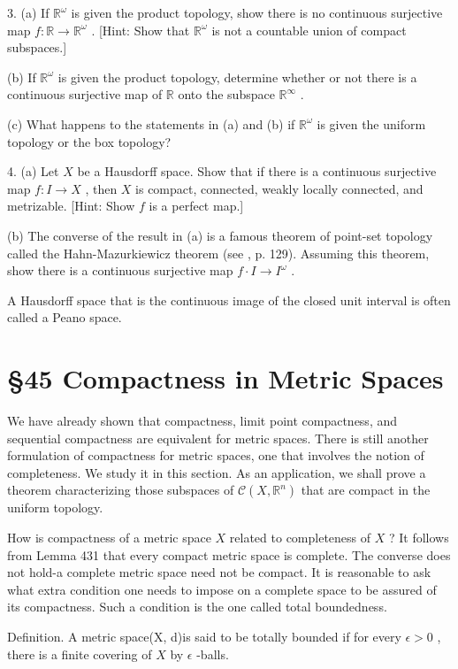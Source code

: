 3. (a) If \({\mathbb{R}}^{\omega }\) is given the product topology, show there is no continuous surjective map \(f : \mathbb{R} \rightarrow  {\mathbb{R}}^{\omega }\) . [Hint: Show that \({\mathbb{R}}^{\omega }\) is not a countable union of compact subspaces.]

(b) If \({\mathbb{R}}^{\omega }\) is given the product topology, determine whether or not there is a continuous surjective map of \(\mathbb{R}\) onto the subspace \({\mathbb{R}}^{\infty }\) .

(c) What happens to the statements in (a) and (b) if \({\mathbb{R}}^{\omega }\) is given the uniform topology or the box topology?

4. (a) Let \(X\) be a Hausdorff space. Show that if there is a continuous surjective map \(f : I \rightarrow  X\) , then \(X\) is compact, connected, weakly locally connected, and metrizable. [Hint: Show \(f\) is a perfect map.]

(b) The converse of the result in (a) is a famous theorem of point-set topology called the Hahn-Mazurkiewicz theorem (see 		\cite{HockingYoung1961}, p. 129). Assuming this theorem, show there is a continuous surjective map \(f \cdot  I \rightarrow  {I}^{\omega }\) .

A Hausdorff space that is the continuous image of the closed unit interval is often called a Peano space.

\section*{§45 Compactness in Metric Spaces}

We have already shown that compactness, limit point compactness, and sequential compactness are equivalent for metric spaces. There is still another formulation of compactness for metric spaces, one that involves the notion of completeness. We study it in this section. As an application, we shall prove a theorem characterizing those subspaces of \(\mathcal{C}\left( {X,{\mathbb{R}}^{n}}\right)\) that are compact in the uniform topology.

How is compactness of a metric space \(X\) related to completeness of \(X\) ? It follows from Lemma 431 that every compact metric space is complete. The converse does not hold-a complete metric space need not be compact. It is reasonable to ask what extra condition one needs to impose on a complete space to be assured of its compactness. Such a condition is the one called total boundedness.

Definition. A metric space(X, d)is said to be totally bounded if for every \(\epsilon  > 0\) , there is a finite covering of \(X\) by \(\epsilon\) -balls.

